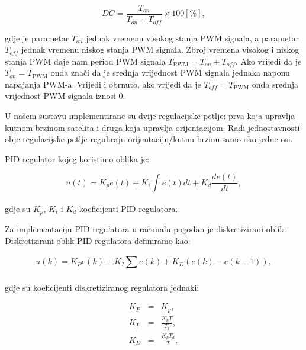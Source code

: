 \documentclass[times, utf8, diplomski, numeric]{templates/template}
\begin{document}
{{{{                \begin{equation}
                    DC = \frac{T_{on}}{T_{on} + T_{off}} \times 100 \left[ \% \right],
                \end{equation}

                gdje je parametar $T_{on}$ jednak vremenu visokog stanja PWM signala, a parametar $T_{off}$ jednak vremenu niskog stanja PWM signala. Zbroj vremena visokog i niskog stanja PWM daje nam period PWM signala $T_{\text{PWM}} = T_{on} + T_{off}$. Ako vrijedi da je $T_{on}=T_{\text{PWM}}$ onda znači da je srednja vrijednost PWM signala jednaka naponu napajanja PWM-a. Vrijedi i obrnuto, ako vrijedi da je $T_{off}=T_{\text{PWM}}$ onda srednja vrijednost PWM signala iznosi 0.

                U našem sustavu implementirane su dvije regulacijske petlje: prva koja upravlja kutnom brzinom satelita i druga koja upravlja orijentacijom. Radi jednostavnosti obje regulacijske petlje reguliraju orijentaciju/kutnu brzinu samo oko jedne osi.

                PID regulator kojeg koristimo oblika je:

                \begin{equation}
                    u(t) = K_p e(t) + K_i \int_{}^{}{e(t)dt} + K_d \frac{de(t)}{dt},
                \end{equation}

                gdje su $K_p$, $K_i$ i $K_d$ koeficijenti PID regulatora.

                Za implementaciju PID regulatora u računalu pogodan je diskretizirani oblik. Diskretizirani oblik PID regulatora \cite{diskr_pid} definiramo kao:

                \begin{equation}
                    u(k) = K_P e(k) + K_I \sum_{}^{}{e(k)} + K_D (e(k) - e(k-1)),
                \end{equation}

                gdje su koeficijenti diskretiziranog regulatora jednaki:

                \begin{equation}
                    \begin{array}{rcl}
                        K_P & = & K_p,\\
                        K_I & = & \frac{K_p T}{T_i}, \\
                        K_D & = & \frac{K_p T_d}{T},
                    \end{array}
                \end{equation}

}}}}
\end{document}

